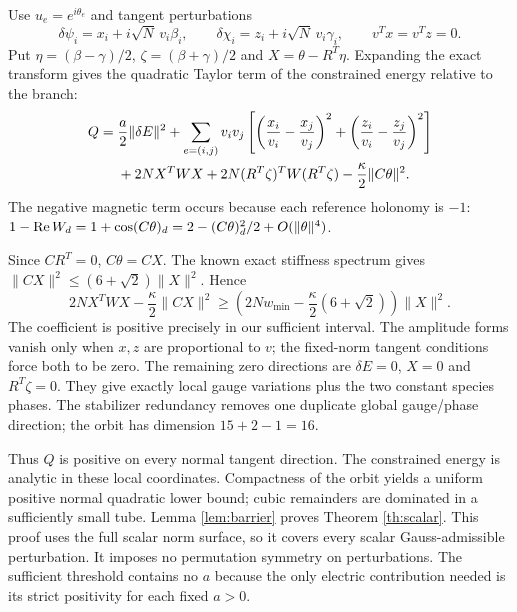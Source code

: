 \documentclass[11pt,a4paper]{article}
\begin{document}
Use $u_e=e^{i\theta_e}$ and tangent perturbations
\[
\delta\psi_i=x_i+i\sqrt N\,v_i\beta_i,\qquad
\delta\chi_i=z_i+i\sqrt N\,v_i\gamma_i,
\qquad v^Tx=v^Tz=0.
\]
Put $\eta=(\beta-\gamma)/2$, $\zeta=(\beta+\gamma)/2$ and
$X=\theta-R^T\eta$. Expanding the exact transform gives the quadratic Taylor term of the constrained energy relative to the branch:
\begin{align}
Q={}&\frac a2\|\delta E\|^2+
\sum_{e=(i,j)}v_iv_j\left[
\left(\frac{x_i}{v_i}-\frac{x_j}{v_j}\right)^2+
\left(\frac{z_i}{v_i}-\frac{z_j}{v_j}\right)^2\right]\notag\\
&+2N X^TWX+2N(R^T\zeta)^TW(R^T\zeta)
-\frac\kappa2\|C\theta\|^2.\label{eq:Q}
\end{align}
The negative magnetic term occurs because each reference holonomy is $-1$:
$1-\operatorname{Re} W_d=1+\cos(C\theta)_d=2-(C\theta)_d^2/2+O(\|\theta\|^4)$.

Since $CR^T=0$, $C\theta=CX$. The known exact stiffness spectrum gives
$\|CX\|^2\leq(6+\sqrt2)\|X\|^2$. Hence
\[
2NX^TWX-\frac\kappa2\|CX\|^2
\geq\left(2Nw_{\min}-\frac\kappa2(6+\sqrt2)\right)\|X\|^2.
\]
The coefficient is positive precisely in our sufficient interval. The amplitude forms vanish only when $x,z$ are proportional to $v$; the fixed-norm tangent conditions force both to be zero. The remaining zero directions are $\delta E=0$, $X=0$ and $R^T\zeta=0$. They give exactly local gauge variations plus the two constant species phases. The stabilizer redundancy removes one duplicate global gauge/phase direction; the orbit has dimension $15+2-1=16$.

Thus $Q$ is positive on every normal tangent direction. The constrained energy is analytic in these local coordinates. Compactness of the orbit yields a uniform positive normal quadratic lower bound; cubic remainders are dominated in a sufficiently small tube. Lemma \ref{lem:barrier} proves Theorem \ref{th:scalar}. This proof uses the full scalar norm surface, so it covers every scalar Gauss-admissible perturbation. It imposes no permutation symmetry on perturbations. The sufficient threshold contains no $a$ because the only electric contribution needed is its strict positivity for each fixed $a>0$.

\newpage
\end{document}
